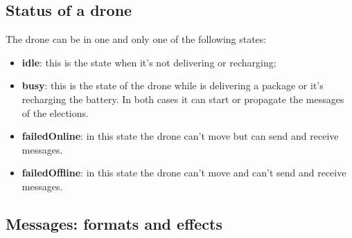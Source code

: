 \documentclass[a4paper, oneside]{memoir}
\begin{document}
\subsection{Status of a drone}
The drone can be in one and only one of the following states:
\begin{itemize}
	\item \textbf{idle}: this is the state when it's not delivering or recharging;
	\item \textbf{busy}: this is the state of the drone while is delivering a package or it's recharging the battery. In both cases it can start or propagate the messages of the elections.
	\item \textbf{failedOnline}: in this state the drone can't move but can send and receive messages.
	\item \textbf{failedOffline}: in this state the drone can't move and can't send and receive messages.
\end{itemize}


\subsection{Messages: formats and effects}
\end{document}
